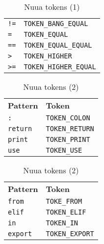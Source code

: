 \begin{table}[H]
\begin{subtable}{0.45\textwidth}
\begin{tabular}{ l l }
            \texttt{!=} & \texttt{TOKEN\_BANG\_EQUAL} \\
            \texttt{=} & \texttt{TOKEN\_EQUAL} \\
            \texttt{==} & \texttt{TOKEN\_EQUAL\_EQUAL} \\
            \texttt{>} & \texttt{TOKEN\_HIGHER} \\
            \texttt{>=} & \texttt{TOKEN\_HIGHER\_EQUAL} \\
		\end{tabular}
		\caption{}
	\end{subtable}
	\caption{Nuua tokens (1)}
    \label{fig:nuua_tokens_1}
\end{table}

\begin{table}[H]
	\centering
	\begin{subtable}{0.45\textwidth}
		\centering
        \begin{tabular}{ l l }
            \textbf{Pattern} & \textbf{Token} \\
            \texttt{:} & \texttt{TOKEN\_COLON} \\
            \texttt{return} & \texttt{TOKEN\_RETURN} \\
            \texttt{print} & \texttt{TOKEN\_PRINT} \\
            \texttt{use} & \texttt{TOKEN\_USE} \\
		\end{tabular}
		\caption{}
	\end{subtable}
	\begin{subtable}{0.45\textwidth}
		\centering
        \begin{tabular}{ l l }
            \textbf{Pattern} & \textbf{Token} \\
            \texttt{from} & \texttt{TOKE\_FROM} \\
            \texttt{elif} & \texttt{TOKEN\_ELIF} \\
            \texttt{in} & \texttt{TOKEN\_IN} \\
            \texttt{export} & \texttt{TOKEN\_EXPORT} \\
		\end{tabular}
		\caption{}
	\end{subtable}
	\caption{Nuua tokens (2)}
    \label{fig:nuua_tokens_2}
\end{table}

